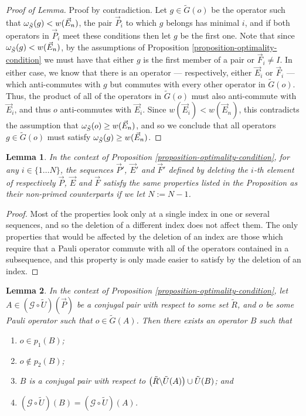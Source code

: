 \documentclass[twocolumn,showpacs,preprintnumbers,amsmath,amssymb,nofootinbib,pra,floatfix]{revtex4-1}
\newtheorem{lemma}{Lemma}
\newcommand{\lst}{\vec}
\newcommand{\set}{\tilde}
\newcommand{\genfun}{\mathcal{G}}
\begin{document}
\begin{proof}[Proof of Lemma]
Proof by contradiction.  Let $g\in \set G(o)$ be the operator such that $\om_{\set S}(g)<w(\lst E_n)$, the pair $\lst P_i$ to which $g$ belongs has minimal $i$, and if both operators in $\lst P_i$ meet these conditions then let $g$ be the first one.  Note that since $\om_{\set S}(g)<w(\lst E_n)$, by the assumptions of Proposition \ref{proposition-optimality-condition} we must have that either $g$ is the first member of a pair or $\lst F_i\ne I$.  In either case, we know that there is an operator --- respectively, either $\lst E_i$ or $\lst F_i$ --- which anti-commutes with $g$ but commutes with every other operator in $\set G(o)$.  Thus, the product of all of the operators in $\set G(o)$ must also anti-commute with $\lst E_i$, and thus $o$ anti-commutes with $\lst E_i$.  Since $w(\lst E_i)<w(\lst E_n)$, this contradicts the assumption that $\om_{\set S}(o)\ge w(\lst E_n)$, and so we conclude that all operators $g\in\set G(o)$ must satisfy $\om_{\set S}(g)\ge w(\lst E_n)$.
\end{proof}
\begin{lemma}
\label{deleting-pair-maintains-properties}
In the context of Proposition \ref{proposition-optimality-condition}, for any $i\in\{1\dots N\}$, the sequences $\lst P'$, $\lst E'$ and $\lst F'$ defined by deleting the $i$-th element of respectively $\lst P$, $\lst E$ and $\lst F$ satisfy the same properties listed in the Proposition as their non-primed counterparts if we let $N:=N-1$.
\end{lemma}

\begin{proof}
Most of the properties look only at a single index in one or several sequences, and so the deletion of a different index does not affect them.  The only properties that would be affected by the deletion of an index are those which require that a Pauli operator commute with all of the operators contained in a subsequence, and this property is only made easier to satisfy by the deletion of an index.
\end{proof}
\begin{lemma}
\label{single-pair-rearrangement}
In the context of Proposition \ref{proposition-optimality-condition}, let $A\in(\genfun\circ\set U)(\lst P)$ be a conjugal pair with respect to some set $\set R$, and $o$ be some Pauli operator such that $o\in\set G(A)$.  Then there exists an operator $B$ such that
\begin{enumerate}
\item $o\in p_1(B)$;
\item $o\notin p_2(B)$;
\item $B$ is a conjugal pair with respect to $\paren{\set R\backslash \set U(A)}\cup\set U(B)$; and
\item $(\genfun\circ\set U)(B) = (\genfun\circ\set U)(A)$.
\end{enumerate}
\end{lemma}
\end{document}
